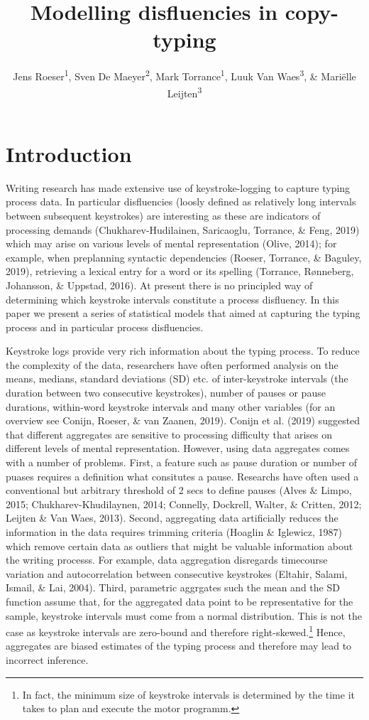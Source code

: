 \documentclass[english,jou,floatsintext]{apa7}
\author{Jens Roeser\textsuperscript{1}, Sven De Maeyer\textsuperscript{2}, Mark Torrance\textsuperscript{1}, Luuk Van Waes\textsuperscript{3}, \& Mariëlle Leijten\textsuperscript{3}}
\affiliation{
\vspace{0.5cm}
\textsuperscript{1} Department of Psychology, Nottingham Trent University, United Kingdom\\\textsuperscript{2} Faculty of Social Sciences, University of Antwerp, Belgium\\\textsuperscript{3} Department of Management, University of Antwerp, Belgium}
\title{Modelling disfluencies in copy-typing}
\date{}
\begin{document}
\maketitle

\hypertarget{introduction}{%
\section{Introduction}\label{introduction}}

Writing research has made extensive use of keystroke-logging to capture typing process data. In particular disfluencies (loosly defined as relatively long intervals between subsequent keystrokes) are interesting as these are indicators of processing demands (Chukharev-Hudilainen, Saricaoglu, Torrance, \& Feng, 2019) which may arise on various levels of mental representation (Olive, 2014); for example, when preplanning syntactic dependencies (Roeser, Torrance, \& Baguley, 2019), retrieving a lexical entry for a word or its spelling (Torrance, Rønneberg, Johansson, \& Uppstad, 2016). At present there is no principled way of determining which keystroke intervals constitute a process disfluency. In this paper we present a series of statistical models that aimed at capturing the typing process and in particular process disfluencies.

Keystroke logs provide very rich information about the typing process. To reduce the complexity of the data, researchers have often performed analysis on the means, medians, standard deviations (SD) etc. of inter-keystroke intervals (the duration between two consecutive keystrokes), number of pauses or pause durations, within-word keystroke intervals and many other variables (for an overview see Conijn, Roeser, \& van Zaanen, 2019). Conijn et al. (2019) suggested that different aggregates are sensitive to processing difficulty that arises on different levels of mental representation. However, using data aggregates comes with a number of problems. First, a feature such as pause duration or number of puases requires a definition what consitutes a pause. Researchs have often used a conventional but arbitrary threshold of 2 secs to define pauses (Alves \& Limpo, 2015; Chukharev-Khudilaynen, 2014; Connelly, Dockrell, Walter, \& Critten, 2012; Leijten \& Van Waes, 2013). Second, aggregating data artificially reduces the information in the data requires trimming criteria (Hoaglin \& Iglewicz, 1987) which remove certain data as outliers that might be valuable information about the writing processs. For example, data aggregation disregards timecourse variation and autocorrelation between consecutive keystrokes (Eltahir, Salami, Ismail, \& Lai, 2004). Third, parametric aggrgates such the mean and the SD function assume that, for the aggregated data point to be representative for the sample, keystroke intervals must come from a normal distribution. This is not the case as keystroke intervals are zero-bound and therefore right-skewed.\footnote{In fact, the minimum size of keystroke intervals is determined by the time it takes to plan and execute the motor programm.} Hence, aggregates are biased estimates of the typing process and therefore may lead to incorrect inference.
\end{document}
